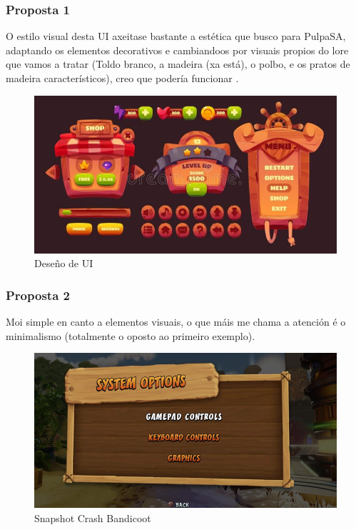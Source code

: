\documentclass{report}  %
\begin{document}
\subsubsection{Proposta 1}
O estilo visual desta UI axeitase bastante a estética que busco para PulpaSA, 
adaptando os elementos decorativos e cambiandoos por visuais propios do 
lore que vamos a tratar (Toldo branco, a madeira (xa está), o polbo, e os pratos 
de madeira característicos), creo que podería funcionar .
\begin{figure}[h]
    \centering
    \includegraphics[width=1\textwidth]{images/inspiracion1.png}
    \caption{Deseño de UI}
    \label{fig:Overcooked}
\end{figure}
\clearpage
\subsubsection{Proposta 2}
Moi simple en canto a elementos visuais, o que máis me chama a atención é o 
minimalismo (totalmente o oposto ao primeiro exemplo).
\begin{figure}[h]
    \centering
    \includegraphics[width=1\textwidth]{images/inspiracion2.png}
    \caption{Snapshot Crash Bandicoot}
    \label{fig:Proposta ui (Crash Bandicoot)}
\end{figure}
\clearpage
\end{document}
